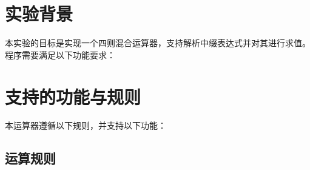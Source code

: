 \documentclass[UTF8]{ctexart}
\begin{document}
\pagestyle{fancy}
\fancyhead{}

\section{实验背景}
本实验的目标是实现一个四则混合运算器，支持解析中缀表达式并对其进行求值。程序需要满足以下功能要求：

\section{支持的功能与规则}
本运算器遵循以下规则，并支持以下功能：

\subsection{运算规则}
\end{document}
